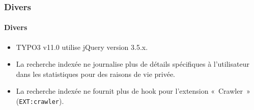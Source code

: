 %

\begin{frame}[fragile]
	\frametitle{Divers}
	\framesubtitle{Divers}

	\begin{itemize}
		\item TYPO3 v11.0 utilise jQuery version 3.5.x.
		\item La recherche indexée ne journalise plus de détails spécifiques à l'utilisateur
			dans les statistiques pour des raisons de vie privée.
		\item La recherche indexée ne fournit plus de hook pour l'extension «~Crawler~»
			(\small\texttt{EXT:crawler}\normalsize).
	\end{itemize}

\end{frame}

